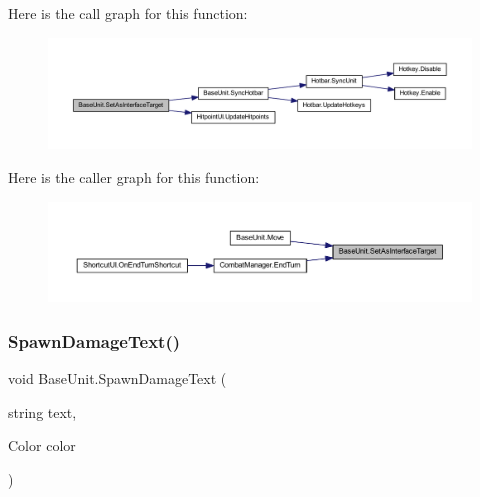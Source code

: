 Here is the call graph for this function\+:\nopagebreak
\begin{figure}[H]
\begin{center}
\leavevmode
\includegraphics[width=350pt]{class_base_unit_abae0a52156648495ea6e8487782f8636_cgraph}
\end{center}
\end{figure}
Here is the caller graph for this function\+:\nopagebreak
\begin{figure}[H]
\begin{center}
\leavevmode
\includegraphics[width=350pt]{class_base_unit_abae0a52156648495ea6e8487782f8636_icgraph}
\end{center}
\end{figure}
\mbox{\label{class_base_unit_aacee7b4acfdd28621f3a1b66bf8d646a}} 
\subsubsection{\texorpdfstring{SpawnDamageText()}{SpawnDamageText()}}
{\footnotesize\ttfamily void Base\+Unit.\+Spawn\+Damage\+Text (\begin{DoxyParamCaption}\item[{string}]{text,  }\item[{Color}]{color }\end{DoxyParamCaption})}

